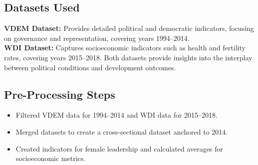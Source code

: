 \documentclass[a4paper,12pt]{article}
\begin{document}
\subsection*{Datasets Used}
\textbf{VDEM Dataset:} Provides detailed political and democratic indicators, focusing on governance and representation, covering years 1994–2014. \\
\textbf{WDI Dataset:} Captures socioeconomic indicators such as health and fertility rates, covering years 2015–2018. Both datasets provide insights into the interplay between political conditions and development outcomes.

\subsection*{Pre-Processing Steps}
\begin{itemize}
    \item Filtered VDEM data for 1994–2014 and WDI data for 2015–2018.
    \item Merged datasets to create a cross-sectional dataset anchored to 2014.
    \item Created indicators for female leadership and calculated averages for socioeconomic metrics.
\end{itemize}
\end{document}
